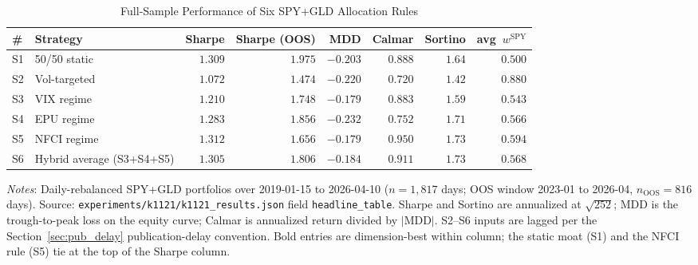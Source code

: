 \documentclass[12pt,a4paper]{article}
\begin{document}
\begin{table}[H]
\centering
\small
\begin{threeparttable}
\caption{Full-Sample Performance of Six SPY+GLD Allocation Rules}
\label{tab:k1121_headline}
\begin{tabular}{@{}llrrrrrr@{}}
\toprule
\# & Strategy & Sharpe & Sharpe (OOS) & MDD & Calmar & Sortino & avg\ $w^{\text{SPY}}$ \\
\midrule
S1 & 50/50 static                & $\mathbf{1.309}$ & $1.975$ & $-0.203$ & $0.888$ & $1.64$ & $0.500$ \\
S2 & Vol-targeted                & $1.072$           & $1.474$ & $-0.220$ & $0.720$ & $1.42$ & $0.880$ \\
S3 & VIX regime                  & $1.210$           & $1.748$ & $\mathbf{-0.179}$ & $0.883$ & $1.59$ & $0.543$ \\
S4 & EPU regime                  & $1.283$           & $1.856$ & $-0.232$ & $0.752$ & $1.71$ & $0.566$ \\
S5 & NFCI regime                 & $\mathbf{1.312}$  & $1.656$ & $\mathbf{-0.179}$ & $\mathbf{0.950}$ & $1.73$ & $0.594$ \\
S6 & Hybrid average (S3+S4+S5)   & $1.305$           & $1.806$ & $-0.184$ & $0.911$ & $1.73$ & $0.568$ \\
\bottomrule
\end{tabular}
\begin{tablenotes}
\small
\item \textit{Notes}: Daily-rebalanced SPY+GLD portfolios over 2019-01-15 to 2026-04-10 ($n=1{,}817$ days; OOS window 2023-01 to 2026-04, $n_{\text{OOS}}=816$ days). Source: \texttt{experiments/k1121/k1121\_results.json} field \texttt{headline\_table}. Sharpe and Sortino are annualized at $\sqrt{252}$; MDD is the trough-to-peak loss on the equity curve; Calmar is annualized return divided by $|\text{MDD}|$. S2--S6 inputs are lagged per the Section~\ref{sec:pub_delay} publication-delay convention. Bold entries are dimension-best within column; the static moat (S1) and the NFCI rule (S5) tie at the top of the Sharpe column.
\end{tablenotes}
\end{threeparttable}
\end{table}
\end{document}
